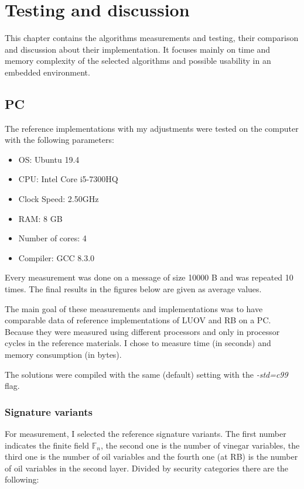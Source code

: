 \documentclass[thesis=M,english]{FITthesis}[2019/12/23]
\begin{document}
\chapter{Testing and discussion} \label{test-and-disk}
This chapter contains the algorithms measurements and testing, their comparison and discussion about their implementation. It focuses mainly on time and memory complexity of the selected algorithms and possible usability in an embedded environment. 

\section{PC}
The reference implementations with my adjustments were tested on the computer with the following parameters: 
\begin{itemize}
\item OS: Ubuntu 19.4
\item CPU: Intel Core i5-7300HQ
\item Clock Speed: 2.50GHz
\item RAM: 8 GB
\item Number of cores: 4
\item Compiler: GCC 8.3.0
\end{itemize}

\bigskip
\noindent
Every measurement was done on a message of size 10000 B and was repeated 10 times. The final results in the figures below are given as average values.

\bigskip
\noindent
The main goal of these measurements and implementations was to have comparable data of reference implementations of LUOV and RB on a PC. Because they were measured using different processors and only in processor cycles in the reference materials. I chose to measure time (in seconds) and memory consumption (in bytes).

\bigskip
\noindent
The solutions were compiled with the same (default) setting with the \textit{-std=c99} flag.

\subsection{Signature variants} \label{pc-sign-variants}
For measurement, I selected the reference signature variants. The first number indicates the finite field $\mathbb{F}_{n}$, the second one is the number of vinegar variables, the third one is the number of oil variables and the fourth one (at RB) is the number of oil variables in the second layer. Divided by security categories there are the following:
\end{document}
